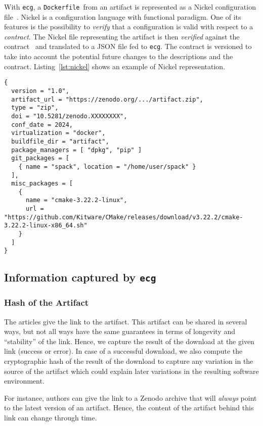 \documentclass[sigconf,natbib=false]{acmart}
\newcommand{\df}{\texttt{Dockerfile}}
\newcommand{\ecg}{\texttt{ecg}}
\begin{document}
With \ecg, a \df\ from an artifact is represented as a Nickel configuration file~\cite{nickel}.
Nickel is a configuration language with functional paradigm.
One of its features is the possibility to \emph{verify} that a configuration is valid with respect to a \emph{contract}.
The Nickel file representing the artifact is then \emph{verified} against the contract~\cite{ecg_contract} and translated to a JSON file fed to \ecg.
The contract is versioned to take into account the potential future changes to the descriptions and the contract.
Listing~\ref{lst:nickel} shows an example of Nickel representation.

\begin{lstlisting}[caption=Example of Artifact Nickel representation\label{lst:nickel}]
{
  version = "1.0",
  artifact_url = "https://zenodo.org/.../artifact.zip",
  type = "zip",
  doi = "10.5281/zenodo.XXXXXXXX",
  conf_date = 2024,
  virtualization = "docker",
  buildfile_dir = "artifact",
  package_managers = [ "dpkg", "pip" ]
  git_packages = [
    { name = "spack", location = "/home/user/spack" }
  ],
  misc_packages = [
    {
      name = "cmake-3.22.2-linux",
      url = "https://github.com/Kitware/CMake/releases/download/v3.22.2/cmake-3.22.2-linux-x86_64.sh"
    }
  ]
}
\end{lstlisting}


\subsection{Information captured by \ecg}\label{sec:ecg:capture}

\subsubsection{Hash of the Artifact}

The articles give the link to the artifact.
This artifact can be shared in several ways, but not all ways have the same guarantees in terms of longevity and ``stability'' of the link.
Hence, we capture the result of the download at the given link (success or error).
In case of a successful download, we also compute the cryptographic hash of the result of the download to capture any variation in the source of the artifact which could explain later variations in the resulting software environment.

For instance, authors can give the link to a Zenodo archive that will \emph{always} point to the latest version of an artifact.
Hence, the content of the artifact behind this link can change through time.
\end{document}
